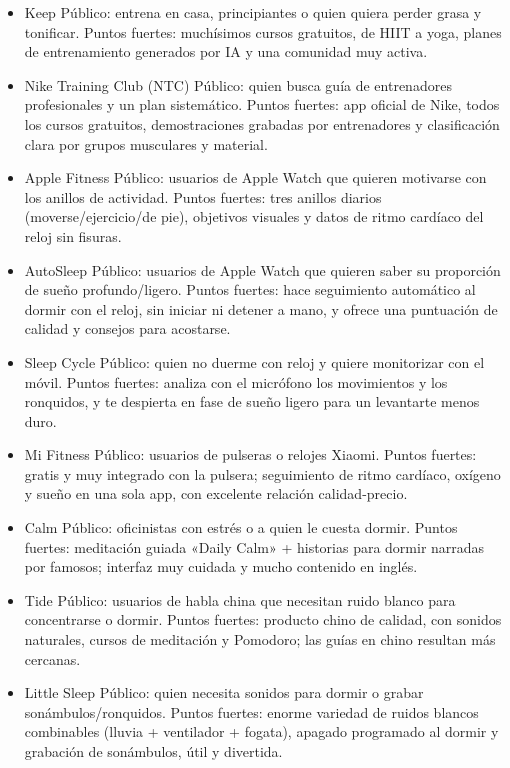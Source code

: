 \begin{itemize}
  \item Keep Público: entrena en casa, principiantes o quien quiera perder grasa y tonificar. Puntos fuertes: muchísimos cursos gratuitos, de HIIT a yoga, planes de entrenamiento generados por IA y una comunidad muy activa.
  \item Nike Training Club (NTC) Público: quien busca guía de entrenadores profesionales y un plan sistemático. Puntos fuertes: app oficial de Nike, todos los cursos gratuitos, demostraciones grabadas por entrenadores y clasificación clara por grupos musculares y material.
  \item Apple Fitness Público: usuarios de Apple Watch que quieren motivarse con los anillos de actividad. Puntos fuertes: tres anillos diarios (moverse/ejercicio/de pie), objetivos visuales y datos de ritmo cardíaco del reloj sin fisuras.
\end{itemize}


\begin{itemize}
  \item AutoSleep Público: usuarios de Apple Watch que quieren saber su proporción de sueño profundo/ligero. Puntos fuertes: hace seguimiento automático al dormir con el reloj, sin iniciar ni detener a mano, y ofrece una puntuación de calidad y consejos para acostarse.
  \item Sleep Cycle Público: quien no duerme con reloj y quiere monitorizar con el móvil. Puntos fuertes: analiza con el micrófono los movimientos y los ronquidos, y te despierta en fase de sueño ligero para un levantarte menos duro.
  \item Mi Fitness Público: usuarios de pulseras o relojes Xiaomi. Puntos fuertes: gratis y muy integrado con la pulsera; seguimiento de ritmo cardíaco, oxígeno y sueño en una sola app, con excelente relación calidad-precio.
\end{itemize}


\begin{itemize}
  \item Calm Público: oficinistas con estrés o a quien le cuesta dormir. Puntos fuertes: meditación guiada «Daily Calm» + historias para dormir narradas por famosos; interfaz muy cuidada y mucho contenido en inglés.
  \item Tide Público: usuarios de habla china que necesitan ruido blanco para concentrarse o dormir. Puntos fuertes: producto chino de calidad, con sonidos naturales, cursos de meditación y Pomodoro; las guías en chino resultan más cercanas.
  \item Little Sleep Público: quien necesita sonidos para dormir o grabar sonámbulos/ronquidos. Puntos fuertes: enorme variedad de ruidos blancos combinables (lluvia + ventilador + fogata), apagado programado al dormir y grabación de sonámbulos, útil y divertida.
\end{itemize}

